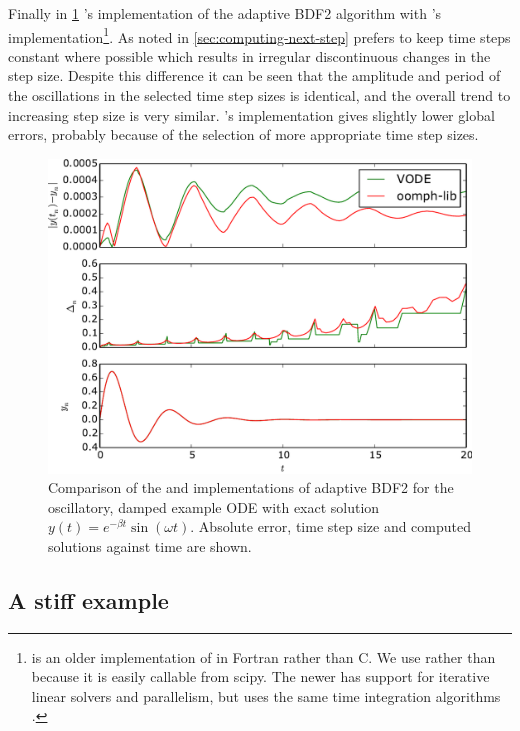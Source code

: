 Finally in \cref{fig:vode-osc-example} \oomph's implementation of the adaptive BDF2 algorithm with \vode's implementation\footnote{\vode is an older implementation of \cvode in Fortran rather than C.
We use \vode rather than \cvode because it is easily callable from scipy.
The newer \cvode has support for iterative linear solvers and parallelism, but uses the same time integration algorithms \cite[1]{cvode-manual}.
}.
As noted in \cref{sec:computing-next-step} \vode prefers to keep time steps constant where possible which results in irregular discontinuous changes in the step size.
Despite this difference it can be seen that the amplitude and period of the oscillations in the selected time step sizes is identical, and the overall trend to increasing step size is very similar.
\oomph's implementation gives slightly lower global errors, probably because of the selection of more appropriate time step sizes.
\begin{figure}[ht]
  \centering
  \includegraphics[width=\textwidth]{plots/scipyode/vode-bdf2}
  \caption{Comparison of the \oomph and \vode implementations of adaptive BDF2 for the oscillatory, damped example ODE with exact solution $y(t) = e^{-\beta t} \sin(\omega t)$.
    Absolute error, time step size and computed solutions against time are shown.}
  \label{fig:vode-osc-example}
\end{figure}


\subsection{A stiff example}
\label{sec:imr-stiff-example}

